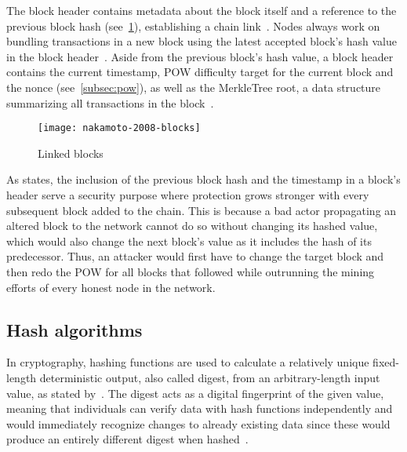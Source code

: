 The block header contains metadata about the block itself and a reference to the previous block hash (see~\cref{fig:prev-block-hash}), establishing a chain link~\autocites[160]{antonopoulos_mastering_2017}[3]{nakamoto_bitcoin_2008}[15]{yaga_blockchain_2018}.
Nodes always work on bundling transactions in a new block using the latest accepted block's hash value in the block header~\autocite[3]{nakamoto_bitcoin_2008}.
Aside from the previous block's hash value, a block header contains the current timestamp, \gls{POW} difficulty target for the current block and the nonce (see~\cref{subsec:pow}), as well as the \gls{MerkleTree} root, a data structure summarizing all transactions in the block~\autocites[160-161]{antonopoulos_mastering_2017}[15-16]{yaga_blockchain_2018}.

\begin{figure}[h]
    \texttt{[image: nakamoto-2008-blocks]}
    \caption[Linked blocks]{Linked blocks~\autocite{nakamoto_bitcoin_2008}}
    \label{fig:prev-block-hash}
\end{figure}

As \textcite[2-3]{nakamoto_bitcoin_2008} states, the inclusion of the previous block hash and the timestamp in a block's header serve a security purpose where protection grows stronger with every subsequent block added to the chain.
This is because a bad actor propagating an altered block to the network cannot do so without changing its hashed value, which would also change the next block's value as it includes the hash of its predecessor.
Thus, an attacker would first have to change the target block and then redo the \gls{POW} for all blocks that followed while outrunning the mining efforts of every honest node in the network.

\subsection{Hash algorithms}\label{subsec:hash-algorithms}

In cryptography, hashing functions are used to calculate a relatively unique fixed-length deterministic output, also called digest, from an arbitrary-length input value, as stated by~\textcite[188]{antonopoulos_mastering_2017}.
The digest acts as a digital fingerprint of the given value, meaning that individuals can verify data with hash functions independently and would immediately recognize changes to already existing data since these would produce an entirely different digest when hashed~\autocites[188-189]{antonopoulos_mastering_2017}[7]{yaga_blockchain_2018}.

